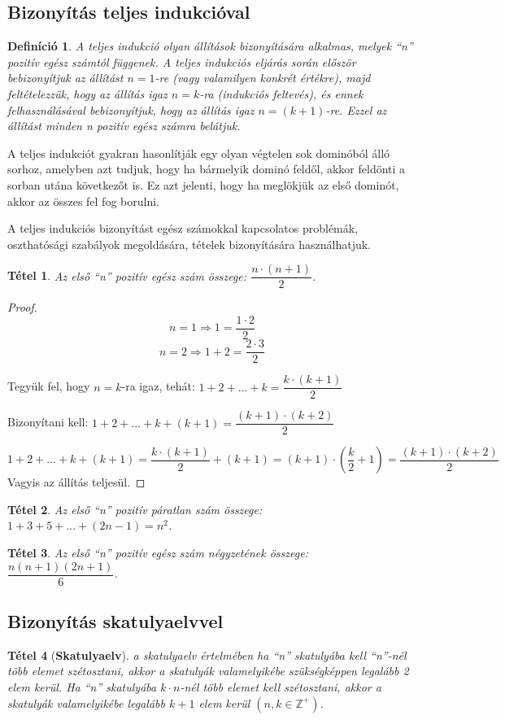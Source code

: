 \documentclass[12pt,a4paper]{article}
\newtheorem{theorem}{Tétel} [section]
\newtheorem{definition}{Definíció} [section]
\begin{document}
\subsection{Bizonyítás teljes indukcióval}
\begin{definition}
A teljes indukció olyan állítások bizonyítására alkalmas, melyek ``n'' pozitív egész
számtól függenek. A teljes indukciós eljárás során először bebizonyítjuk az állítást $n = 1$-re (vagy valamilyen konkrét értékre), majd feltételezzük, hogy az állítás igaz $n = k$-ra (indukciós feltevés), és ennek felhasználásával bebizonyítjuk, hogy az állítás igaz $n = (k + 1)$-re. Ezzel az állítást minden n pozitív egész számra belátjuk.
\end{definition}

A teljes indukciót gyakran hasonlítják egy olyan végtelen sok dominóból álló sorhoz, amelyben azt tudjuk, hogy ha bármelyik dominó feldől, akkor feldönti a sorban utána következőt is. Ez azt jelenti, hogy ha meglökjük az első dominót, akkor az összes fel fog borulni.

A teljes indukciós bizonyítást egész számokkal kapcsolatos problémák, oszthatósági szabályok megoldására, tételek bizonyítására használhatjuk.

\begin{theorem}
Az első ``n'' pozitív egész szám összege: $\dfrac{n\cdot (n+1)}{2}$.
\end{theorem}

\begin{proof}
$$n=1\Rightarrow 1=\dfrac{1\cdot 2}{2}$$
$$n=2\Rightarrow 1+2=\dfrac{2\cdot 3}{2}$$

Tegyük fel, hogy $n = k$-ra igaz, tehát: $1+2+...+k=\dfrac{k\cdot (k+1)}{2}$

Bizonyítani kell: $1+2+...+k+(k+1)=\dfrac{(k+1)\cdot (k+2)}{2}$

$$1+2+...+k+(k+1)=\dfrac{k\cdot (k+1)}{2}+(k+1)=(k+1)\cdot\left(\dfrac{k}{2}+1 \right)=\dfrac{(k+1)\cdot (k+2)}{2}$$
Vagyis az állítás teljesül.
\end{proof}

\begin{theorem}
Az első ``n'' pozitív páratlan szám összege: $1+3+5+...+(2n-1)=n^2$.
\end{theorem}

\begin{theorem}
Az első ``n'' pozitív egész szám négyzetének összege: $\dfrac{n(n+1)(2n+1)}{6}$.
\end{theorem}

\subsection{Bizonyítás skatulyaelvvel}
\begin{theorem}[\textbf{Skatulyaelv}]
a skatulyaelv értelmében ha ``n'' skatulyába kell ``n''-nél több elemet szétosztani, akkor a skatulyák valamelyikébe szükségképpen legalább 2 elem kerül. Ha ``n'' skatulyába $k \cdot n$-nél több elemet kell szétosztani, akkor a skatulyák valamelyikébe legalább $k + 1$ elem kerül $(n,k\in \mathbb{Z}^+)$.
\end{theorem}
\end{document}
